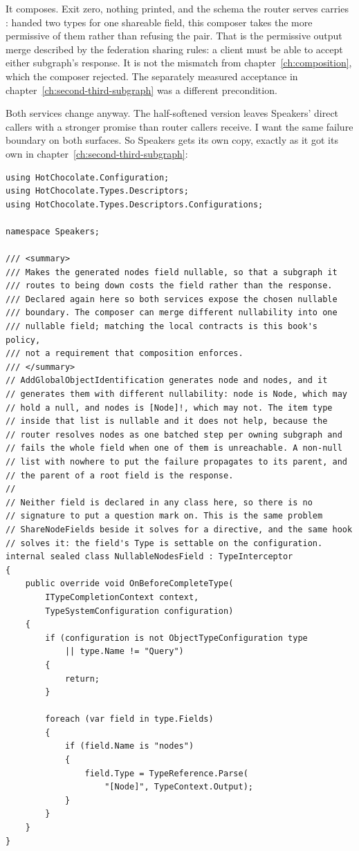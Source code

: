 %
It composes. Exit zero, nothing printed, and the schema the router serves
carries \code{[Node]}: handed two types for one shareable field, this composer
takes the more permissive of them rather than refusing the pair. That is the
permissive output merge described by the federation sharing rules: a client
must be able to accept either subgraph's response. It is not the
 mismatch from chapter~\ref{ch:composition}, which the composer
rejected. The separately measured  acceptance in
chapter~\ref{ch:second-third-subgraph} was a different precondition.

%
Both services change anyway. The half-softened version leaves Speakers'
direct callers with a stronger promise than router callers receive. I want
the same failure boundary on both surfaces. So Speakers gets
its own copy, exactly as it got its own  in
chapter~\ref{ch:second-third-subgraph}:

\begin{verbatim}
using HotChocolate.Configuration;
using HotChocolate.Types.Descriptors;
using HotChocolate.Types.Descriptors.Configurations;

namespace Speakers;

/// <summary>
/// Makes the generated nodes field nullable, so that a subgraph it
/// routes to being down costs the field rather than the response.
/// Declared again here so both services expose the chosen nullable
/// boundary. The composer can merge different nullability into one
/// nullable field; matching the local contracts is this book's policy,
/// not a requirement that composition enforces.
/// </summary>
// AddGlobalObjectIdentification generates node and nodes, and it
// generates them with different nullability: node is Node, which may
// hold a null, and nodes is [Node]!, which may not. The item type
// inside that list is nullable and it does not help, because the
// router resolves nodes as one batched step per owning subgraph and
// fails the whole field when one of them is unreachable. A non-null
// list with nowhere to put the failure propagates to its parent, and
// the parent of a root field is the response.
//
// Neither field is declared in any class here, so there is no
// signature to put a question mark on. This is the same problem
// ShareNodeFields beside it solves for a directive, and the same hook
// solves it: the field's Type is settable on the configuration.
internal sealed class NullableNodesField : TypeInterceptor
{
    public override void OnBeforeCompleteType(
        ITypeCompletionContext context,
        TypeSystemConfiguration configuration)
    {
        if (configuration is not ObjectTypeConfiguration type
            || type.Name != "Query")
        {
            return;
        }

        foreach (var field in type.Fields)
        {
            if (field.Name is "nodes")
            {
                field.Type = TypeReference.Parse(
                    "[Node]", TypeContext.Output);
            }
        }
    }
}
\end{verbatim}

